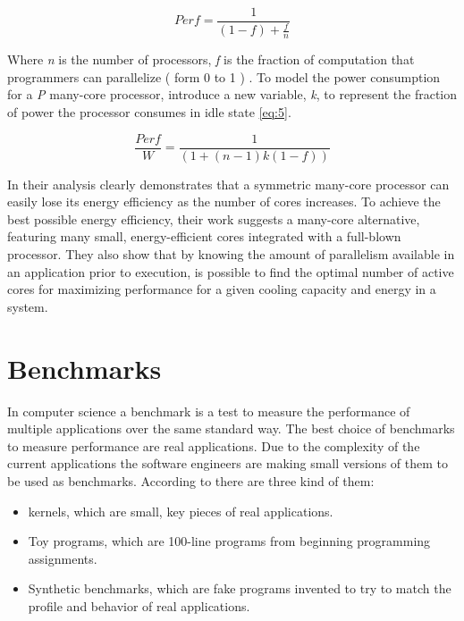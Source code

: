 \begin{equation}\label{eq:4}
Perf = \frac{1}{(1 - f) + \frac{f}{n}}
\end{equation}

Where \textit{n} is the number of processors,  \textit{f} is the fraction of
computation that programmers can parallelize  ( form 0 to 1 ) . To model the
power consumption for a \textit{P} many-core processor, \cite{Dong} introduce a
new variable, \textit{k}, to represent the fraction of power the processor
consumes in idle state \ref{eq:5}. 

\begin{equation}\label{eq:5}
\frac{Perf}{W} = \frac{1}{(1 + (n -1 ) k (1 - f))}
\end{equation}

In \cite{Dong} their analysis clearly demonstrates that a symmetric many-core
processor can easily  lose its energy efficiency as the number of cores
increases. To achieve the  best possible energy efficiency, their  work
suggests a many-core alternative, featuring many small, energy-efficient cores
integrated with a full-blown processor. They also show that by knowing the
amount of parallelism available in an application prior to execution, is
possible to  find the optimal number of active cores for maximizing performance
for a given cooling capacity and energy in a system.

\section{Benchmarks}

In computer science a benchmark is a test to measure the performance of
multiple applications over the same standard way. The best choice of benchmarks
to measure performance are real applications. Due to the complexity of the
current applications the software engineers are making small versions of them
to be used as benchmarks. According to \cite{Hennessy} there are three kind of
them: 

\begin{itemize}
\item kernels, which are small, key pieces of real applications.
\item Toy programs, which are 100-line programs from beginning programming
assignments.
\item Synthetic benchmarks, which are fake programs invented to try to match the
profile and behavior of real applications.
\end{itemize}


